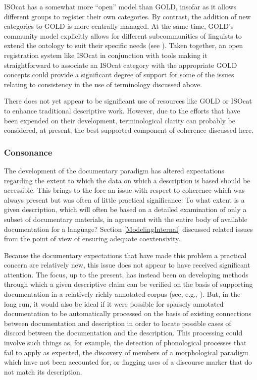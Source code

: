 ISOcat has a somewhat more ``open'' model than GOLD, insofar as it allows
different groups to register their own categories. By contrast, the addition of
new categories to GOLD is more centrally managed. At the same time, GOLD's
community model explicitly allows for different subcommunities of linguists to
extend the ontology to suit their specific needs (see
). Taken together, an open registration
system like ISOcat in conjunction with tools making it straightforward to
associate an ISOcat category with the appropriate GOLD concepts could provide a
significant degree of support for some of the issues relating to consistency in
the use of terminology discussed above.

There does not yet appear to be significant use of resources like GOLD or ISOcat
to enhance traditional descriptive work. However, due to the efforts that have
been expended on their development, terminological clarity can probably be
considered, at present, the best supported component of coherence discussed
here.




\subsubsection{Consonance\label{ConsonanceSec}}

The development of the documentary paradigm has altered expectations regarding
the extent to which the data on which a description is based should be
accessible. This brings to the fore an issue with respect to coherence which was
always present but was often of little practical significance: To what extent is
a given description, which will often be based on a detailed examination of only
a subset of documentary materials, in agreement with the entire body of
available documentation for a language? Section \ref{ModelingInternal} discussed
related issues from the point of view of ensuring adequate coextensivity.

Because the documentary expectations that have made this problem a practical
concern are relatively new, this issue does not appear to have received
significant attention. The focus, up to the present, has instead been on
developing methods through which a given descriptive claim can be verified on
the basis of supporting documentation in a relatively richly annotated corpus
(see, e.g., ). But, in the long run, it would also be
ideal if it were possible for sparsely annotated documentation to be
automatically processed on the basis of existing connections between
documentation and description in order to locate possible cases of discord
between the documentation and the description. This processing could involve
such things as, for example, the detection of phonological processes that fail
to apply as expected, the discovery of members of a morphological paradigm which have not been accounted for, or flagging uses of a discourse marker that do not match
its description.

